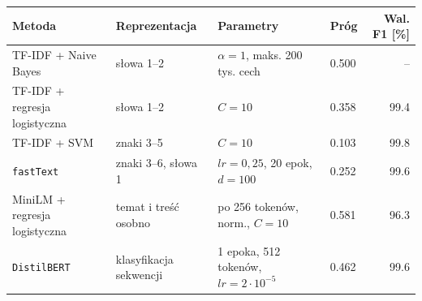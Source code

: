 \begin{tabular}{llllr}
\hline
\textbf{Metoda} & \textbf{Reprezentacja} & \textbf{Parametry} & \textbf{Próg} & \textbf{Wal. F1 [\%]} \\
\hline
TF-IDF + Naive Bayes & słowa 1--2 & \(\alpha=1\), maks. 200 tys. cech & 0.500 & -- \\
TF-IDF + regresja logistyczna & słowa 1--2 & \(C=10\) & 0.358 & 99.4 \\
TF-IDF + SVM & znaki 3--5 & \(C=10\) & 0.103 & 99.8 \\
\texttt{fastText} & znaki 3--6, słowa 1 & \(lr=0{,}25\), 20 epok, \(d=100\) & 0.252 & 99.6 \\
MiniLM + regresja logistyczna & temat i treść osobno & po 256 tokenów, norm., \(C=10\) & 0.581 & 96.3 \\
\texttt{DistilBERT} & klasyfikacja sekwencji & 1 epoka, 512 tokenów, \(lr=2\cdot10^{-5}\) & 0.462 & 99.6 \\
\hline
\end{tabular}
